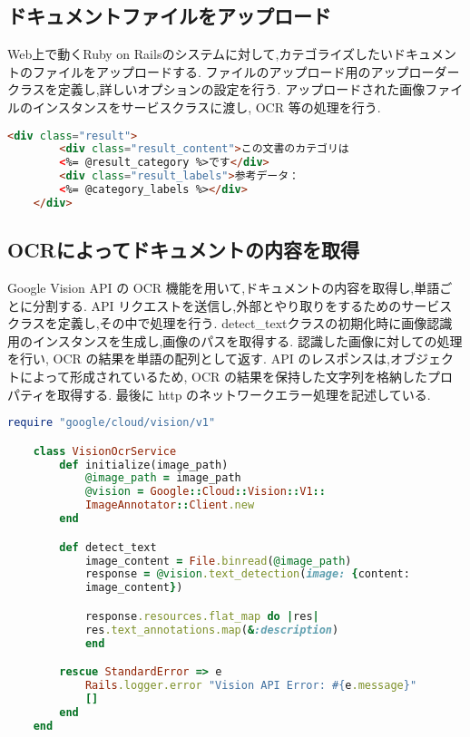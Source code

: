 \subsection{ドキュメントファイルをアップロード}
\label{subsec:app_upload}

Web上で動くRuby on Railsのシステムに対して,カテゴライズしたいドキュメントのファイルをアップロードする.
ファイルのアップロード用のアップローダークラスを定義し,詳しいオプションの設定を行う.
アップロードされた画像ファイルのインスタンスをサービスクラスに渡し, OCR 等の処理を行う.

\begin{lstlisting}[language=HTML, caption=フロントエンドの ERB]
    <div class="result">
        <div class="result_content">この文書のカテゴリは
        <%= @result_category %>です</div>
        <div class="result_labels">参考データ：
        <%= @category_labels %></div>
    </div>
\end{lstlisting}


\clearpage

\subsection{OCRによってドキュメントの内容を取得}
\label{subsec:app_ocr}

Google Vision API の OCR 機能を用いて,ドキュメントの内容を取得し,単語ごとに分割する.
API リクエストを送信し,外部とやり取りをするためのサービスクラスを定義し,その中で処理を行う.
detect\_textクラスの初期化時に画像認識用のインスタンスを生成し,画像のパスを取得する.
認識した画像に対しての処理を行い, OCR の結果を単語の配列として返す.
API のレスポンスは,オブジェクトによって形成されているため, OCR の結果を保持した文字列を格納したプロパティを取得する.
最後に http のネットワークエラー処理を記述している.

\begin{lstlisting}[language=Ruby, caption=Ruby による OCR の実装]
    require "google/cloud/vision/v1"

    class VisionOcrService
        def initialize(image_path)
            @image_path = image_path
            @vision = Google::Cloud::Vision::V1::
            ImageAnnotator::Client.new
        end

        def detect_text
            image_content = File.binread(@image_path)
            response = @vision.text_detection(image: {content:
            image_content})

            response.resources.flat_map do |res|
            res.text_annotations.map(&:description)
            end

        rescue StandardError => e
            Rails.logger.error "Vision API Error: #{e.message}"
            []
        end
    end
\end{lstlisting}



